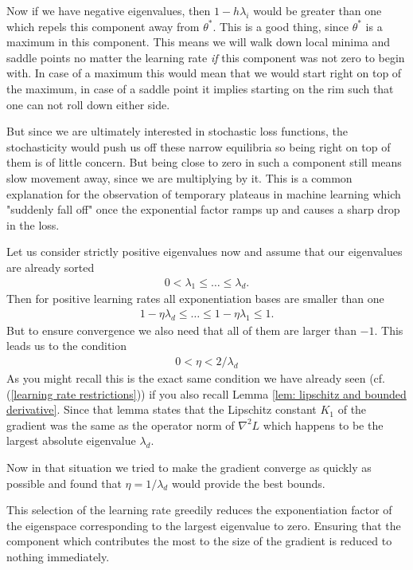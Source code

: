 Now if we have negative eigenvalues, then \(1-h\lambda_i\) would be greater
than one which repels this component away from \(\theta^*\). This is a good
thing, since \(\theta^*\) is a maximum in this component. This means we will
walk down local minima and saddle points no matter the learning rate \emph{if}
this component was not zero to begin with. In case of a maximum this would mean
that we would start right on top of the maximum, in case of a saddle point
it implies starting on the rim such that one can not roll down either side.

But since we are ultimately interested in stochastic loss functions, the
stochasticity would push us off these narrow equilibria so being right on
top of them is of little concern. But being close to zero in such a component
still means slow movement away, since we are multiplying by it. This is a
common explanation for the observation of temporary plateaus in machine learning
which "suddenly fall off" once the exponential factor ramps up and causes a
sharp drop in the loss.

Let us consider strictly positive eigenvalues now and assume that our
eigenvalues are already sorted
%
\begin{align}
	0 < \lambda_1 \le \dots \le \lambda_d.
\end{align}
%
Then for positive learning rates all exponentiation bases are smaller than one
%
\begin{align*}
	1-\eta\lambda_d \le \dots \le 1-\eta\lambda_1 \le 1.
\end{align*}
%
But to ensure convergence we also need that all of them are larger than \(-1\).
This leads us to the condition
\begin{align}\label{eq: learning rate restriction (eigenvalue)}
	0< \eta < 2/\lambda_d
\end{align}
As you might recall
 this is the exact same condition we have already seen (cf.
(\ref{learning rate
restrictions})) if you also recall Lemma \ref{lem: lipschitz and bounded
derivative}.
Since that lemma states that the Lipschitz constant \(K_1\) of the gradient was the
same as the operator norm of \(\nabla^2 L\) which happens to be the largest 
absolute eigenvalue \(\lambda_d\).

Now in that situation we tried to make the gradient converge as quickly as
possible and found that \(\eta=1/\lambda_d\) would provide the best bounds.

This selection of the learning rate greedily reduces the exponentiation factor
of the eigenspace corresponding to the largest eigenvalue to zero. Ensuring
that the component which contributes the most to the size of the gradient is
reduced to nothing immediately.

